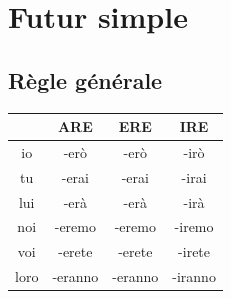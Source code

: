 \documentclass[12pt, openany]{report}
\begin{document}
\section{Futur simple}
\subsection{Règle générale}
\begin{center}
    \begin{tabular}{c|c|c|c}
        & ARE & ERE & IRE\\ \hline
        io & -erò & -erò & -irò\\
        tu & -erai & -erai & -irai\\
        lui & -erà & -erà & -irà\\
        noi & -eremo & -eremo & -iremo\\
        voi & -erete & -erete & -irete\\
        loro & -eranno & -eranno & -iranno\\
    \end{tabular}
\end{center} 
\end{document}
